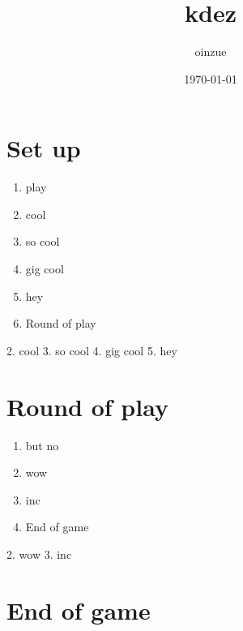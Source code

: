 \documentclass{article}%
\title{kdez}%
\author{oinzue}%
\date{\today}%
\begin{document}
%
\pagestyle{empty}%
\normalsize%
\maketitle%
\section{ Set up
}%
\label{sec:Setup}%
\begin{enumerate}%
\item%
 play
%
\item%
 cool
%
\item%
 so cool
%
\item%
 gig cool
%
\item%
 hey
%
\item%
Round of play
%
\end{enumerate}%
2. cool
%
3. so cool
%
4. gig cool
%
5. hey


%
\section{ Round of play
}%
\label{sec:Roundofplay}%
\begin{enumerate}%
\item%
 but no
%
\item%
 wow
%
\item%
 inc
%
\item%
End of game%
\end{enumerate}%
2. wow
%
3. inc


%
\section{ End of game}%
\label{sec:Endofgame}%

%
\end{document}
